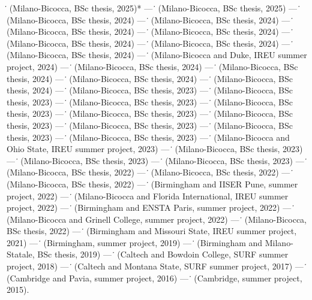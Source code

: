 \textit{\. } (Milano-Bicocca, BSc thesis, 2025)* --- 
\textit{\. } (Milano-Bicocca, BSc thesis, 2025) --- 
\textit{\. } (Milano-Bicocca, BSc thesis, 2024) --- 
\textit{\. } (Milano-Bicocca, BSc thesis, 2024) --- 
\textit{\. } (Milano-Bicocca, BSc thesis, 2024) --- 
\textit{\. } (Milano-Bicocca, BSc thesis, 2024) --- 
\textit{\. } (Milano-Bicocca, BSc thesis, 2024) --- 
\textit{\. } (Milano-Bicocca, BSc thesis, 2024) --- 
\textit{\. } (Milano-Bicocca, BSc thesis, 2024) --- 
\textit{\. } (Milano-Bicocca and Duke, IREU summer project, 2024) --- 
\textit{\. } (Milano-Bicocca, BSc thesis, 2024) --- 
\textit{\. } (Milano-Bicocca, BSc thesis, 2024) --- 
\textit{\. } (Milano-Bicocca, BSc thesis, 2024) --- 
\textit{\. } (Milano-Bicocca, BSc thesis, 2024) --- 
\textit{\. } (Milano-Bicocca, BSc thesis, 2023) --- 
\textit{\. } (Milano-Bicocca, BSc thesis, 2023) --- 
\textit{\. } (Milano-Bicocca, BSc thesis, 2023) --- 
\textit{\. } (Milano-Bicocca, BSc thesis, 2023) --- 
\textit{\. } (Milano-Bicocca, BSc thesis, 2023) --- 
\textit{\. } (Milano-Bicocca, BSc thesis, 2023) --- 
\textit{\. } (Milano-Bicocca, BSc thesis, 2023) --- 
\textit{\. } (Milano-Bicocca, BSc thesis, 2023) --- 
\textit{\. } (Milano-Bicocca, BSc thesis, 2023) --- 
\textit{\. } (Milano-Bicocca and Ohio State, IREU summer project, 2023) --- 
\textit{\. } (Milano-Bicocca, BSc thesis, 2023) --- 
\textit{\. } (Milano-Bicocca, BSc thesis, 2023) --- 
\textit{\. } (Milano-Bicocca, BSc thesis, 2023) --- 
\textit{\. } (Milano-Bicocca, BSc thesis, 2022) --- 
\textit{\. } (Milano-Bicocca, BSc thesis, 2022) --- 
\textit{\. } (Milano-Bicocca, BSc thesis, 2022) --- 
\textit{\. } (Birmingham and IISER Pune, summer project, 2022) --- 
\textit{\. } (Milano-Bicocca and Florida International, IREU summer project, 2022) --- 
\textit{\. } (Birmingham and ENSTA Paris, summer project, 2022) --- 
\textit{\. } (Milano-Bicocca and Grinell College, summer project, 2022) --- 
\textit{\. } (Milano-Bicocca, BSc thesis, 2022) --- 
\textit{\. } (Birmingham and Missouri State, IREU summer project, 2021) --- 
\textit{\. } (Birmingham, summer project, 2019) --- 
\textit{\. } (Birmingham and Milano-Statale, BSc thesis, 2019) --- 
\textit{\. } (Caltech and Bowdoin College, SURF summer project, 2018) --- 
\textit{\. } (Caltech and Montana State, SURF summer project, 2017) --- 
\textit{\. } (Cambridge and Pavia, summer project, 2016) --- 
\textit{\. } (Cambridge, summer project, 2015).